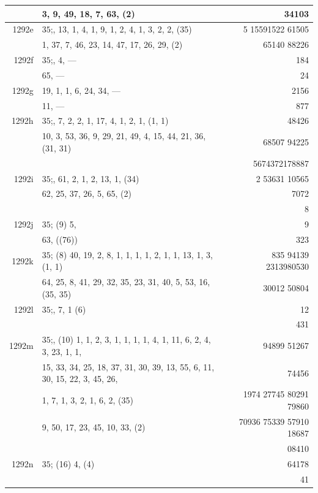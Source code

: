 \documentclass[11pt]{article}
\begin{document}
{\begin{longtable}{|r|p{8.5cm}|r|}
       & 3, 9, 49, 18, 7, 63, (2) & 34103 \\
\hline
1292e  & $35$;\; 57, 13, 1, 4, 1, 9, 1, 2, 4, 1, 3, 2, 2, (35) & 5 15591522 61505 \\
       & 1, 37, 7, 46, 23, 14, 47, 17, 26, 29, (2) & 65140 88226 \\
\hline
1292f  & $35$;\; 58, 4, --- & 184 \\
       & 65, --- & 24 \\
\hline
1292g  & 19, 1, 1, 6, 24, 34, --- & 2156 \\
       & 11, --- & 877 \\
\hline
1292h  & $35$;\; 1, 7, 2, 2, 1, 17, 4, 1, 2, 1, (1, 1) & 48426 \\
       & 10, 3, 53, 36, 9, 29, 21, 49, 4, 15, 44, 21, 36, (31, 31) & 68507 94225 \\
       & & 5674372178887 \\
\hline
1292i  & $35$;\; 5, 61, 2, 1, 2, 13, 1, (34) & 2 53631 10565 \\
       & 62, 25, 37, 26, 5, 65, (2) & 7072 \\
       & & 8 \\
\hline
1292j  & $35$;\; (9) 5, & 9 \\
       & 63, ((76)) & 323 \\
\hline
1292k  & $35$;\; (8) 40, 19, 2, 8, 1, 1, 1, 1, 2, 1, 1, 13, 1, 3, (1, 1) & 835 94139 2313980530 \\
       & 64, 25, 8, 41, 29, 32, 35, 23, 31, 40, 5, 53, 16, (35, 35) & 30012 50804 \\
\hline
1292l  & $35$;\; 65, 7, 1 (6) & 12 \\
       & & 431 \\
\hline
1292m  & $35$;\; 66, (10) 1, 1, 2, 3, 1, 1, 1, 1, 4, 1, 11, 6, 2, 4, 3, 23, 1, 1, & 94899 51267 \\
       & 15, 33, 34, 25, 18, 37, 31, 30, 39, 13, 55, 6, 11, 30, 15, 22, 3, 45, 26, & 74456 \\
       & 1, 7, 1, 3, 2, 1, 6, 2, (35) & 1974 27745 80291 79860 \\
       & 9, 50, 17, 23, 45, 10, 33, (2) & 70936 75339 57910 18687 \\
       & & 08410 \\
\hline
1292n  & $35$;\; (16) 4, (4) & 64178 \\
       & & 41 \\
\hline
\end{longtable}
}
\end{document}
